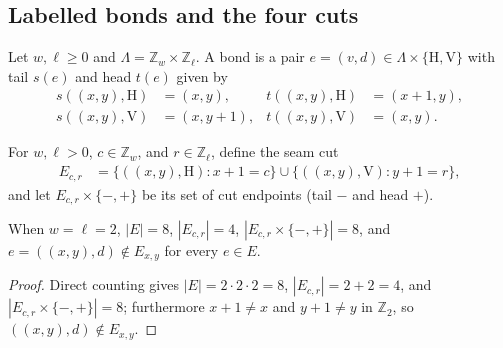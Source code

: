 
\subsection{Labelled bonds and the four cuts}

\begin{definition}%
    \label{def:peps_labelled_bonds}
    \leanok
    Let $w,\ell\ge0$ and $\Lambda=\mathbb Z_w\times\mathbb Z_\ell$. A bond is a pair $e=(v,d)\in\Lambda\times\{\mathrm H,\mathrm V\}$ with tail $s(e)$ and head $t(e)$ given by
    \begin{align}
        s((x,y),\mathrm H) & =(x,y),   & t((x,y),\mathrm H) & =(x+1,y),\nonumber \\
        s((x,y),\mathrm V) & =(x,y+1), & t((x,y),\mathrm V) & =(x,y).
        \label{eq:peps_labelled_endpoints}
    \end{align}
\end{definition}

\begin{definition}%
    \label{def:peps_labelled_cut}
    \leanok
    For $w,\ell>0$, $c\in\mathbb Z_w$, and $r\in\mathbb Z_\ell$, define the seam cut
    \begin{align}
        E_{c,r}
         & =\{((x,y),\mathrm H):x+1=c\}
        \cup\{((x,y),\mathrm V):y+1=r\},
        \label{eq:peps_labelled_cut}
    \end{align}
    and let $E_{c,r}\times\{-,+\}$ be its set of cut endpoints (tail $-$ and head $+$).
\end{definition}

\begin{lemma}%
    \label{thm:peps_labelled_cut_card}
    \leanok
    When $w=\ell=2$, $|E|=8$, $|E_{c,r}|=4$, $|E_{c,r}\times\{-,+\}|=8$, and $e=((x,y),d)\notin E_{x,y}$ for every $e\in E$.
\end{lemma}
\begin{proof}\leanok
    Direct counting gives $|E|=2\cdot2\cdot2=8$, $|E_{c,r}|=2+2=4$, and $|E_{c,r}\times\{-,+\}|=8$; furthermore $x+1\ne x$ and $y+1\ne y$ in $\mathbb Z_2$, so $((x,y),d)\notin E_{x,y}$.
\end{proof}

